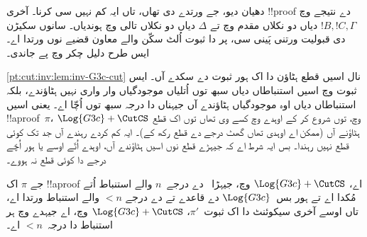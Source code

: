 \documentclass[../../../include/open-logic-section]{subfiles}
\begin{document}
دھیان دیو، جے \Cut{} ورتدے \CutCS دی تھاں، تاں ایہ کم نہیں سی کرنا۔ آخری !!{proof} دے نتیجے وچ $!B, !C, \Gamma$ دیاں دو نکلاں مقدم وچ تے $\Delta$ دیاں دو نکلاں تالی وچ ہوندیاں۔ سانوں سکیڑن دی قبولیت ورتنی پَینی سی، پر  دا ثبوت اُلٹ سکّن والے معاون قضیے نوں ورتدا اے۔ ایس طرح دلیل چکر وچ پے جاندی۔

\cref{pt:cut:inv:lem:inv-G3c-cut} نال اسیں قطع ہٹاؤن دا اک ہور ثبوت دے سکدے آں۔ ایس ثبوت وچ اسیں \CutCS{} استنباطاں دیاں سبھ توں اُتلیاں موجودگیاں وار واری نہیں ہٹاؤندے، بلکہ \CutCS{} استنباطاں دیاں اوہ موجودگیاں ہٹاؤندے آں جیہناں دا درجہ سبھ توں اُچّا اے۔ یعنی اسیں !!a{proof}~$\pi$، $\Log{G3c} + \CutCS$ وچ، توں شروع کر کے اوہدے وچ کسے وی تھاں توں اک قطع ہٹاؤنے آں (ممکن اے اوہدی تھاں گھٹ درجے دے قطع رکھ کے)۔ ایہ کم کردے رہندے آں جد تک کوئی قطع نہیں رہندا۔ بس ایہ شرط اے کہ جیہڑے قطع نوں اسیں ہٹاؤندے آں، اوہدے اُتّے اوسے یا ہور اُچّے درجے دا کوئی قطع نہ ہووے۔

\begin{lem}
جے $\pi$ اک !!a{proof} اے، $\Log{G3c}+\CutCS$ وچ، جیہڑا~\CutCS{} دے درجے~$n$ والے استنباط اُتے مُکدا اے تے ہور بس~$\Log{G3c}$ دے قاعدے تے \CutCS{} دے درجے $<n$ والے استنباط ورتدا اے، تاں اوسے آخری سیکوئنٹ دا اک ثبوت~$\pi'$، $\Log{G3c} + \CutCS$ وچ، اے جیہدے وچ ہر \CutCS{} استنباط دا درجہ~$<n$ اے۔
\end{lem}
\end{document}
